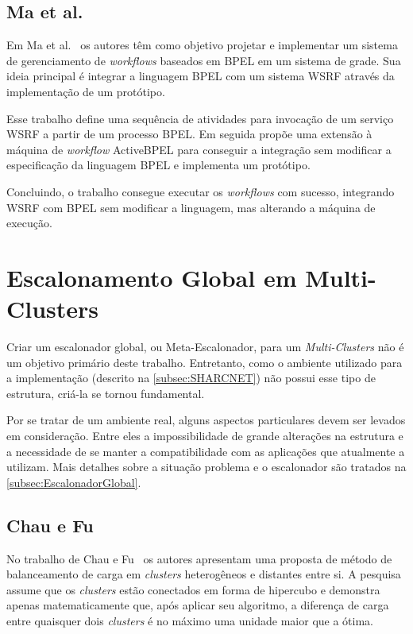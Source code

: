 \documentclass[12pt]{report} %
\begin{document}
	\subsection{Ma et al.}
	    Em Ma et al.~\cite{GridEnabledWF08} os autores têm como objetivo projetar e implementar um sistema de gerenciamento de \textit{workflows} baseados em BPEL em um sistema de grade.
	    Sua ideia principal é integrar a linguagem BPEL com um sistema WSRF através da implementação de um protótipo.
	    
	    Esse trabalho define uma sequência de atividades para invocação de um serviço WSRF a partir de um processo BPEL.
	    Em seguida propõe uma extensão à máquina de \textit{workflow} ActiveBPEL para conseguir a integração sem modificar a especificação da linguagem BPEL e implementa um protótipo.

	    Concluindo, o trabalho consegue executar os \textit{workflows} com sucesso, integrando WSRF com BPEL sem modificar a linguagem, mas alterando a máquina de execução.



    \section{Escalonamento Global em Multi-Clusters}
    \label{sec:RelatedEscalonador}
	Criar um escalonador global, ou Meta-Escalonador, para um \textit{Multi-Clusters} não é um objetivo primário deste trabalho.
	Entretanto, como o ambiente utilizado para a implementação (descrito na \autoref{subsec:SHARCNET}) não possui esse tipo de estrutura, criá-la se tornou fundamental.

	Por se tratar de um ambiente real, alguns aspectos particulares devem ser levados em consideração.
	Entre eles a impossibilidade de grande alterações na estrutura e a necessidade de se manter a compatibilidade com as aplicações que atualmente a utilizam.
	Mais detalhes sobre a situação problema e o escalonador são tratados na \autoref{subsec:EscalonadorGlobal}.
  

	\subsection{Chau e Fu}
	    No trabalho de Chau e Fu~\cite{Chau03:2} os autores apresentam uma proposta de método de balanceamento de carga em \textit{clusters} heterogêneos e distantes entre si.
	    A pesquisa assume que os \textit{clusters} estão conectados em forma de hipercubo e demonstra apenas matematicamente que, após aplicar seu algoritmo, a diferença de carga entre quaisquer dois \textit{clusters} é no máximo uma unidade maior que a ótima.
\end{document}
